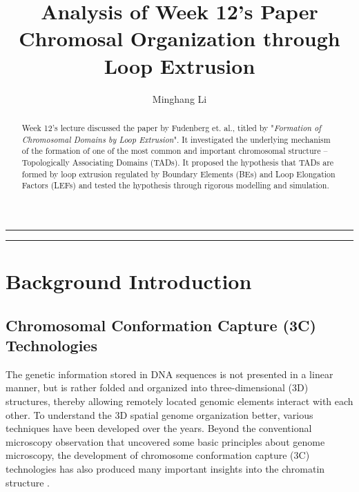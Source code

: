 \documentclass[11pt]{article}
\title{\vspace{-2em}\small{Analysis of Week 12's Paper}\\\LARGE{Chromosal Organization through Loop Extrusion}\vspace{-1em}}
\author{Minghang Li}
\date{\vspace{-1em}}
\begin{document}
\maketitle \thispagestyle{fancy}

\bigskip
\hrule \vspace{1pt}
\hrule height 1pt
\bigskip




\begin{abstract}
  \noindent Week 12's lecture discussed the paper by Fudenberg et. al., titled by "\textit{Formation of Chromosomal Domains by Loop Extrusion}". It investigated the underlying mechanism of the formation of one of the most common and important chromosomal structure -- Topologically Associating Domains (TADs). It proposed the hypothesis that TADs are formed by loop extrusion regulated by Boundary Elements (BEs) and Loop Elongation Factors (LEFs) and tested the hypothesis through rigorous modelling and simulation.
\end{abstract}

\section{Background Introduction}

\subsection{Chromosomal Conformation Capture (3C) Technologies}

The genetic information stored in DNA sequences is not presented in a linear manner, but is rather folded and organized into three-dimensional (3D) structures, thereby allowing remotely located genomic elements interact with each other. To understand the 3D spatial genome organization better, various techniques have been developed over the years. Beyond the conventional microscopy observation that uncovered some basic principles about genome microscopy, the development of chromosome conformation capture (3C) technologies has also produced many important insights into the chromatin structure \cite{denker_second_2016}.
\end{document}
